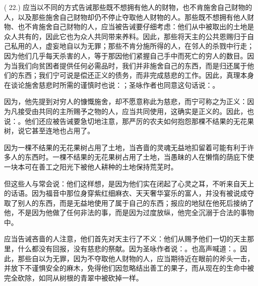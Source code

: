 ( 22.) 应当以不同的方式告诫那些既不想拥有他人的财物，也不肯施舍自己财物的人，以及那些施舍自己财物却仍不停止夺取他人财物的人。那些既不想拥有他人财物、也不肯施舍自己财物的人，应当被告诫要仔细考虑：他们从中被取出的土地是众人共有的，因此它也为众人共同带来养料。因此，那些将天主的公共恩赐归于自己私用的人，虚妄地自以为无罪；那些不肯分施所得的人，在邻人的杀戮中行走；因为他们几乎每天杀害的人，等于那因他们紧握自己手中而死亡的穷人的数目。因为当我们向贫困者提供任何必需品时，我们并非施舍自己的东西，而是归还属于他们的东西；我们宁可说是偿还正义的债务，而非完成慈悲的工作。因此，真理本身在谈论施舍慈悲时所需的谨慎时也说：；圣咏作者也同意这句话说：。\par

因为，他先提到对穷人的慷慨施舍，却不愿意称此为慈悲，而宁可称之为正义：因为凡接受由共同的主所赐予之物的人，应当共同使用，这确实是正义的。因此，也说：。他们还应被告诫要急切地注意，那严厉的农夫如何抱怨那棵不结果的无花果树，说它甚至连地也占用了。\par

因为一棵不结果的无花果树占用了土地，当吝啬的灵魂无益地扣留着可能有利于许多人的东西时。一棵不结果的无花果树占用了土地，当愚昧的人在懒惰的荫庇下使一块本可在善工之阳光下被他人耕种的土地保持荒芜时。\par

但这些人与常会说：他们这样想，是因为他们实在闭起了心灵之耳，不听来自天上的话语。因为福音中那位身穿紫红细麻衣、天天奢华宴乐的富人，并没有被说成夺取了别人的东西，而是无益地使用了属于自己的东西；报应的地狱在他死后接纳了他，不是因为他做了任何非法的事，而是因为过度放纵，他完全沉溺于合法的事物中。\par

应当告诫吝啬的人注意，他们首先对天主行了不义：他们从赐予他们一切的天主那里，什么都没有回报，没有慈悲的祭献。因为圣咏作者说：。也高声喊道：。因此，那些自以为无罪，因为不夺取他人财物的人，应当期待近在眼前的斧头一击，并放下不谨惧安全的麻木，免得他们因忽略结出善工的果子，而从现在的生命中被完全砍除，如同从树根的青翠中被砍掉一样。\par

